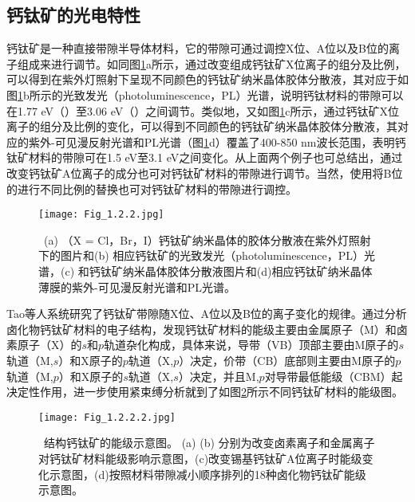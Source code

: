 \documentclass[forlib]{WHUMaster}   %
\begin{document}
\subsection{钙钛矿的光电特性}

{\songti{}钙钛矿是一种直接带隙半导体材料\cite{RN59}，它的带隙可通过调控X位、A位以及B位的离子组成来进行调节。如同图\ref{fig:1.2.2}a所示，通过改变组成钙钛矿X位离子的组分及比例，可以得到在紫外灯照射下呈现不同颜色的钙钛矿纳米晶体胶体分散液，其对应于如图\ref{fig:1.2.2}b所示的光致发光（photoluminescence，PL）光谱，说明钙钛材料的带隙可以在1.77 eV（）至3.06 eV（）之间调节\cite{RN60}。类似地，又如图\ref{fig:1.2.2}c所示，通过钙钛矿X位离子的组分及比例的变化，可以得到不同颜色的钙钛矿纳米晶体胶体分散液，其对应的紫外-可见漫反射光谱和PL光谱（图\ref{fig:1.2.2}d）覆盖了400-850 nm波长范围，表明钙钛矿材料的带隙可在1.5 eV至3.1 eV之间变化\cite{RN61}。从上面两个例子也可总结出，通过改变钙钛矿A位离子的成分也可对钙钛矿材料的带隙进行调节。当然，使用将B位的进行不同比例的替换也可对钙钛矿材料的带隙进行调控\cite{RN69}。

\begin{figure}[ht]
\centering
  \texttt{[image: Fig\_1.2.2.jpg]}
  \caption{\rm \ (a)  （X = Cl，Br，I）钙钛矿纳米晶体的胶体分散液在紫外灯照射下的图片和(b) 相应钙钛矿的光致发光（photoluminescence，PL）光谱\cite{RN60}，(c) 和钙钛矿纳米晶体胶体分散液图片和(d)相应钙钛矿纳米晶体薄膜的紫外-可见漫反射光谱和PL光谱\cite{RN61}。}
  \label{fig:1.2.2}
\end{figure}

Tao等人系统研究了钙钛矿带隙随X位、A位以及B位的离子变化的规律\cite{RN137}。通过分析卤化物钙钛矿材料的电子结构，发现钙钛矿材料的能级主要由金属原子（M）和卤素原子（X）的$s$和$p$轨道杂化构成，具体来说，导带（VB）顶部主要由M原子的$s$轨道（M,$s$）和X原子的$p$轨道（X,$p$）决定，价带（CB）底部则主要由M原子的$p$轨道（M,$p$）和X原子的$s$轨道（X,$s$）决定，并且M,$p$对导带最低能级（CBM）起决定性作用，进一步使用紧束缚分析就到了如图\ref{fig:1.2.2.2}所示不同钙钛矿材料的能级图。

\begin{figure}[ht]
\centering
  \texttt{[image: Fig\_1.2.2.2.jpg]}
  \caption{\rm \ 结构钙钛矿的能级示意图\cite{RN137}。 (a) (b) 分别为改变卤素离子和金属离子对钙钛矿材料能级影响示意图，(c)改变锡基钙钛矿A位离子时能级变化示意图，(d)按照材料带隙减小顺序排列的18种卤化物钙钛矿能级示意图。}
  \label{fig:1.2.2.2}
\end{figure}

}
\end{document}
